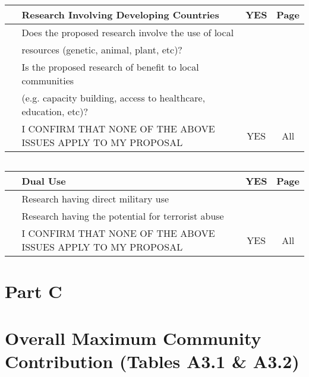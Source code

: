 \documentclass[12pt]{article}
\begin{document}
{$\;$\\ $\;$\\
\begin{tabular}{|c|l|c|c|}
\hline
  $\;$     &   Research Involving Developing Countries  &   YES   &    Page                                               \\
\hline
       &   Does the proposed research involve the use of local      &  &      \\
&resources (genetic, animal, plant, etc)?     &  &      \\
\hline
       &   Is the proposed research of benefit to local communities        &  &                                      \\
&(e.g. capacity building, access to healthcare, education, etc)?     &  &                                             \\
\hline
       &   I CONFIRM THAT NONE OF THE ABOVE ISSUES APPLY TO MY PROPOSAL  &    YES &      All                         \\
\hline
\end{tabular}

$\;$\\ $\;$\\
\begin{tabular}{|c|l|c|c|}
\hline
  $\;$     &   Dual Use     &        YES  &    Page                                                                  \\
\hline
       &   Research having direct military use        &  &                                                            \\
\hline
       &   Research having the potential for terrorist abuse     &  &                                                 \\
\hline
       &   I CONFIRM THAT NONE OF THE ABOVE ISSUES APPLY TO MY PROPOSAL   &   YES &      All                     \\
\hline
\end{tabular}


}




\newpage

\pagestyle{mainC}

\section*{Part C}

\section{Overall Maximum Community Contribution (Tables A3.1 \& A3.2)}
\end{document}
